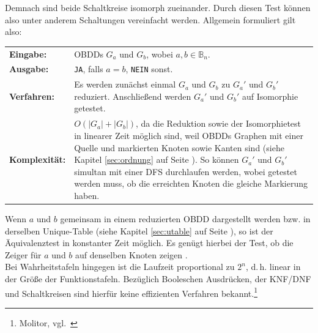 Demnach sind beide Schaltkreise isomorph zueinander. Durch diesen Test können also unter anderem Schaltungen vereinfacht werden. Allgemein formuliert gilt also:\\
\begin{tabular}{l|p{12cm}}
	\textbf{Eingabe:} & OBDDs $G_a$ und $G_b$, wobei $a, b \in \mathbb{B}_n$. \\ 
	\textbf{Ausgabe:} & \texttt{JA}, falls $a = b$, \texttt{NEIN} sonst. \\ 
	\textbf{Verfahren:} & Es werden zunächst einmal $G_a$ und $G_b$ zu $G_a'$ und $G_b'$ reduziert. Anschließend werden $G_a'$ und $G_b'$ auf Isomorphie getestet.\\
	\textbf{Komplexität:} & $O(|G_a|+|G_b|)$, da die Reduktion sowie der Isomorphietest in linearer Zeit möglich sind, weil OBDDs Graphen mit einer Quelle und markierten Knoten sowie Kanten sind (siehe Kapitel \ref{sec:ordnung} auf Seite \pageref{sec:ordnung}). So können $G_a'$ und $G_b'$ simultan mit einer DFS durchlaufen werden, wobei getestet werden muss, ob die erreichten Knoten die gleiche Markierung haben.
\end{tabular}
Wenn $a$ und $b$ gemeinsam in einem reduzierten OBDD dargestellt werden bzw. in derselben Unique-Table (siehe Kapitel \ref{sec:utable} auf Seite \pageref{sec:utable}), so ist der Äquivalenztest in konstanter Zeit möglich. Es genügt hierbei der Test, ob die Zeiger für $a$ und $b$ auf denselben Knoten zeigen \cite[S.66]{ms1999}.\\
Bei Wahrheitstafeln hingegen ist die Laufzeit proportional zu $2^n$, d.\,h. linear in der Größe der Funktionstafeln. Bezüglich Booleschen Ausdrücken, der KNF/DNF und Schaltkreisen sind hierfür keine effizienten Verfahren bekannt.\footnote{Molitor, vgl.~\cite{m2007}}

